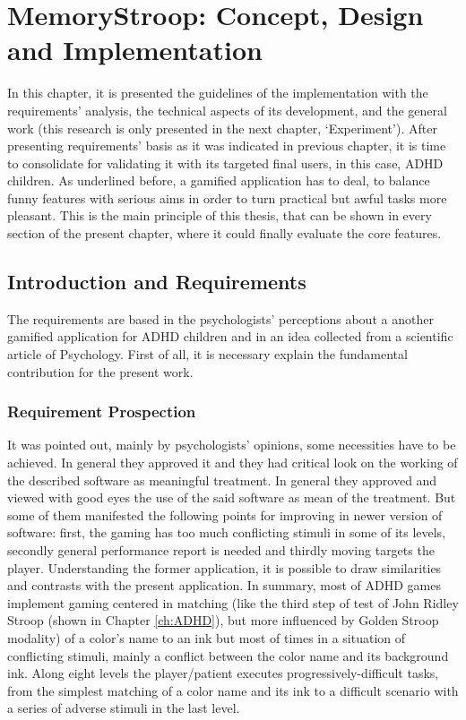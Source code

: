 \chapter{MemoryStroop: Concept, Design and Implementation}
\label{ch:development}

In this chapter, it is presented the guidelines of the implementation with the requirements' analysis, the technical aspects of its development, and the general work  (this research is only presented in the next chapter, `Experiment'). After presenting requirements' basis as it was indicated in previous chapter, it is time to consolidate for validating it with its targeted final users, in this case, ADHD children. As underlined before, a gamified application has to deal, to balance funny features with serious aims in order to turn practical but awful tasks more pleasant. This is the main principle of this thesis, that can be shown in every section of the present chapter, where it could finally evaluate the core features.

\section{Introduction and Requirements}

The requirements are based in the psychologists' perceptions about a another gamified application for ADHD children and in an idea collected from a scientific article of Psychology. First of all, it is necessary explain the fundamental contribution for the present work.

\subsection{Requirement Prospection}

It was pointed out, mainly by psychologists' opinions, some necessities have to be achieved. In general they approved it and they had critical look on the working of the described software as meaningful treatment. In general they approved and viewed with good eyes the use of the said software as mean of the treatment. But some of them manifested the following points for improving in newer version of software: first, the gaming has too much conflicting stimuli in some of its levels, secondly general performance report is needed and thirdly moving targets the player. Understanding the former application, it is possible to draw similarities and contrasts with the present application. In summary, most of ADHD games implement gaming centered in matching  (like the third step of test of John Ridley Stroop (shown in Chapter \ref{ch:ADHD}), but more influenced by Golden Stroop modality) of a color's name to an ink but most of times in a situation of conflicting stimuli, mainly a conflict between the color name and its background ink. Along eight levels the player/patient executes progressively-difficult tasks, from the simplest matching of a color name and its ink to a difficult scenario with a series of adverse stimuli in the last level.

